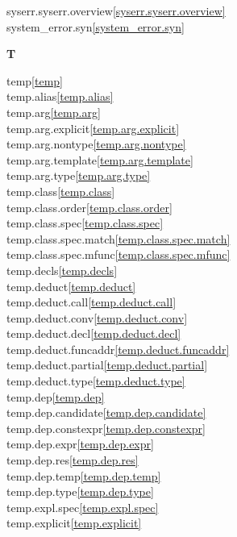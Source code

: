 \begin{multicols}{2}
syserr.syserr.overview\quad\ref{syserr.syserr.overview}\\
system_error.syn\quad\ref{system_error.syn}\\
\par \textbf{T}\par
temp\quad\ref{temp}\\
temp.alias\quad\ref{temp.alias}\\
temp.arg\quad\ref{temp.arg}\\
temp.arg.explicit\quad\ref{temp.arg.explicit}\\
temp.arg.nontype\quad\ref{temp.arg.nontype}\\
temp.arg.template\quad\ref{temp.arg.template}\\
temp.arg.type\quad\ref{temp.arg.type}\\
temp.class\quad\ref{temp.class}\\
temp.class.order\quad\ref{temp.class.order}\\
temp.class.spec\quad\ref{temp.class.spec}\\
temp.class.spec.match\quad\ref{temp.class.spec.match}\\
temp.class.spec.mfunc\quad\ref{temp.class.spec.mfunc}\\
temp.decls\quad\ref{temp.decls}\\
temp.deduct\quad\ref{temp.deduct}\\
temp.deduct.call\quad\ref{temp.deduct.call}\\
temp.deduct.conv\quad\ref{temp.deduct.conv}\\
temp.deduct.decl\quad\ref{temp.deduct.decl}\\
temp.deduct.funcaddr\quad\ref{temp.deduct.funcaddr}\\
temp.deduct.partial\quad\ref{temp.deduct.partial}\\
temp.deduct.type\quad\ref{temp.deduct.type}\\
temp.dep\quad\ref{temp.dep}\\
temp.dep.candidate\quad\ref{temp.dep.candidate}\\
temp.dep.constexpr\quad\ref{temp.dep.constexpr}\\
temp.dep.expr\quad\ref{temp.dep.expr}\\
temp.dep.res\quad\ref{temp.dep.res}\\
temp.dep.temp\quad\ref{temp.dep.temp}\\
temp.dep.type\quad\ref{temp.dep.type}\\
temp.expl.spec\quad\ref{temp.expl.spec}\\
temp.explicit\quad\ref{temp.explicit}\\

\end{multicols}
